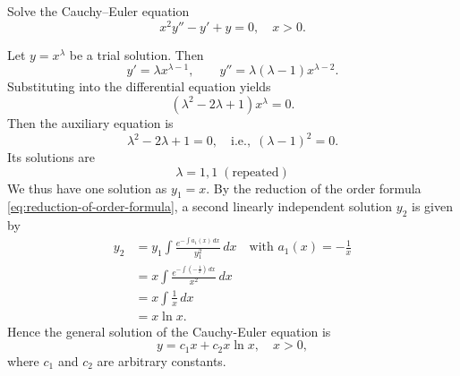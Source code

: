  \begin{example} Solve the Cauchy–Euler equation
 	\[
 	x^2 y'' - y' + y = 0, \quad x>0.
 	\]
 \end{example}
 \begin{solution}
 Let \(y = x^\lambda\) be a trial solution. Then
 \[
 y' = \lambda x^{\lambda-1}, \qquad y'' = \lambda(\lambda-1)x^{\lambda-2}.
 \]
 Substituting into the differential equation yields
 \[(\lambda^2 - 2\lambda + 1)x^\lambda = 0.\] 
 Then the auxiliary equation is
 \[\lambda^2 - 2\lambda + 1=0,\quad  \mbox{i.e.},\;
 (\lambda-1)^2 = 0.\] Its solutions are
 \[
 \lambda =   1, 1 \; (\text{repeated})
 \]
 We thus have one solution as $y_1= x.$  By  the  reduction of the order formula \ref{eq:reduction-of-order-formula}, a second linearly independent solution \(y_2\) is given by
 \[\begin{split}
 	y_2&= y_1 \int \frac{e^{-\int a_1(x)\, dx}}{y_1^2}\, dx\quad \mbox{with } a_1(x) = -\frac{1}{x}\\
 	&= x \int \frac{e^{-\int \left(-\frac{1}{x}\right)\, dx}}{x^2}\, dx\\
 	&=x \int \frac{1}{x}\, dx\\
 	&= x \ln x.
 \end{split}
 \]
Hence the general solution of the Cauchy-Euler equation is 
\[y= c_1 x+c_2 x\ln x,\quad x>0,\]
where $c_1$ and $c_2$ are arbitrary constants.
 \end{solution}
 
